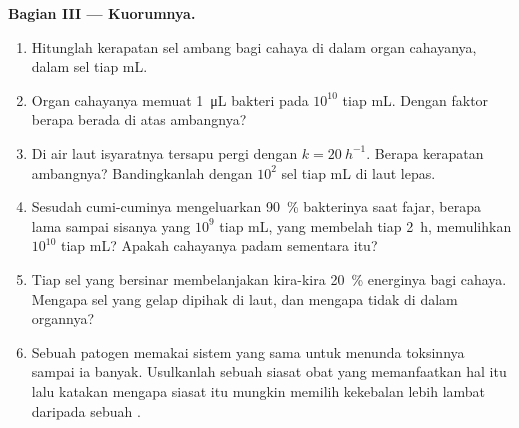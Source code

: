 \begin{problem}
\medskip
\noindent\textbf{Bagian III --- Kuorumnya.}
\begin{enumerate}[resume]
  \item Hitunglah kerapatan sel ambang bagi cahaya di dalam organ
        cahayanya, dalam sel tiap mL.
  \item Organ cahayanya memuat \qty{1}{\micro L} bakteri pada $10^{10}$
        tiap mL. Dengan faktor berapa  berada di atas ambangnya?
  \item Di air laut isyaratnya tersapu pergi dengan $k = \qty{20}{h^{-1}}$.
        Berapa kerapatan ambangnya? Bandingkanlah dengan $10^{2}$ sel tiap mL
        di laut lepas.
  \item Sesudah cumi-cuminya mengeluarkan \qty{90}{\%} bakterinya saat fajar,
        berapa lama sampai sisanya yang $10^{9}$ tiap mL, yang membelah tiap
        \qty{2}{h}, memulihkan $10^{10}$ tiap mL? Apakah cahayanya padam
        sementara itu?
  \item Tiap sel yang bersinar membelanjakan kira-kira \qty{20}{\%} energinya
        bagi cahaya. Mengapa sel yang gelap dipihak di laut, dan mengapa tidak
        di dalam organnya?
  \item Sebuah patogen memakai sistem yang sama untuk menunda toksinnya sampai
        ia banyak. Usulkanlah sebuah siasat obat yang memanfaatkan hal itu lalu
        katakan mengapa siasat itu mungkin memilih kekebalan lebih lambat
        daripada sebuah .
\end{enumerate}


\end{problem}
